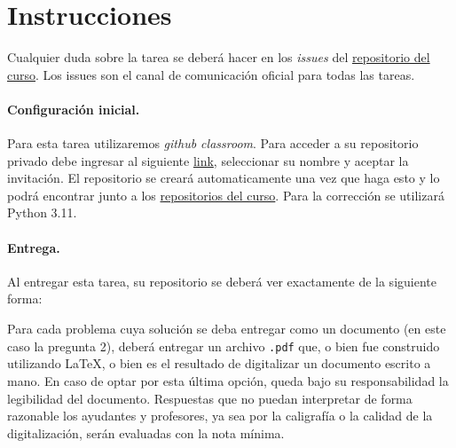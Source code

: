 
\section*{Instrucciones}

Cualquier duda sobre la tarea se deberá hacer en los \emph{issues} del \href{https://github.com/IIC3253/2025}{repositorio del curso}. Los issues son el canal de comunicación oficial para todas las tareas.

\paragraph{Configuración inicial.} 
Para esta tarea utilizaremos \textit{github classroom}. 
Para acceder a su repositorio privado debe ingresar al siguiente \href{https://classroom.github.com/a/m7r98zBe}{link}, seleccionar su nombre y aceptar la invitación.
El repositorio se creará automaticamente una vez que haga esto y lo podrá encontrar junto a los \href{https://github.com/orgs/IIC3253/repositories}{repositorios del curso}.
Para la corrección se utilizará Python 3.11.

\paragraph{Entrega.} Al entregar esta tarea, su repositorio se deberá ver exactamente de la siguiente forma:

\bigskip


\bigskip

Para cada problema cuya solución se deba entregar como un documento (en este caso la pregunta 2), deberá entregar un archivo \texttt{.pdf} que, o bien fue construido utilizando \LaTeX, o bien es el resultado de digitalizar un documento escrito a mano. En caso de optar por esta última opción, queda bajo su responsabilidad la legibilidad del documento. Respuestas que no puedan interpretar de forma razonable los ayudantes y profesores, ya sea por la caligrafía o la calidad de la digitalización, serán evaluadas con la nota mínima.

